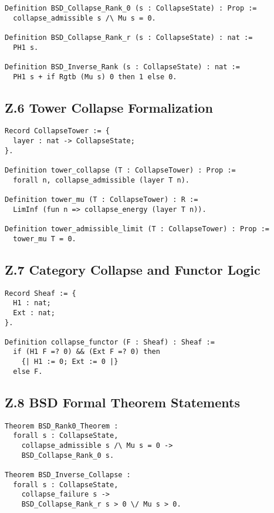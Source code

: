 \documentclass[11pt]{article}
\begin{document}
\begin{lstlisting}[language=Coq]
Definition BSD_Collapse_Rank_0 (s : CollapseState) : Prop :=
  collapse_admissible s /\ Mu s = 0.

Definition BSD_Collapse_Rank_r (s : CollapseState) : nat :=
  PH1 s.

Definition BSD_Inverse_Rank (s : CollapseState) : nat :=
  PH1 s + if Rgtb (Mu s) 0 then 1 else 0.
\end{lstlisting}

\subsection*{Z.6 Tower Collapse Formalization}

\begin{lstlisting}[language=Coq]
Record CollapseTower := {
  layer : nat -> CollapseState;
}.

Definition tower_collapse (T : CollapseTower) : Prop :=
  forall n, collapse_admissible (layer T n).

Definition tower_mu (T : CollapseTower) : R :=
  LimInf (fun n => collapse_energy (layer T n)).

Definition tower_admissible_limit (T : CollapseTower) : Prop :=
  tower_mu T = 0.
\end{lstlisting}

\subsection*{Z.7 Category Collapse and Functor Logic}

\begin{lstlisting}[language=Coq]
Record Sheaf := {
  H1 : nat;
  Ext : nat;
}.

Definition collapse_functor (F : Sheaf) : Sheaf :=
  if (H1 F =? 0) && (Ext F =? 0) then
    {| H1 := 0; Ext := 0 |}
  else F.
\end{lstlisting}

\subsection*{Z.8 BSD Formal Theorem Statements}

\begin{lstlisting}[language=Coq]
Theorem BSD_Rank0_Theorem :
  forall s : CollapseState,
    collapse_admissible s /\ Mu s = 0 ->
    BSD_Collapse_Rank_0 s.

Theorem BSD_Inverse_Collapse :
  forall s : CollapseState,
    collapse_failure s ->
    BSD_Collapse_Rank_r s > 0 \/ Mu s > 0.
\end{lstlisting}
\end{document}
